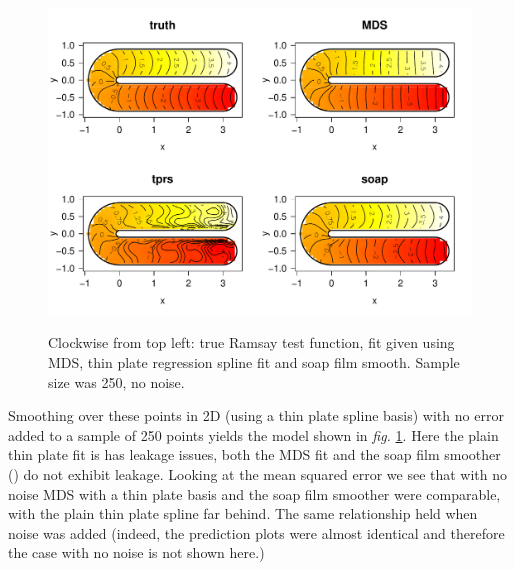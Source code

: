 \documentclass[a4paper,10pt]{article}
\newcommand{\fig}[1]{\emph{fig.} \ref{#1}}
\begin{document}
\begin{figure}
\centering
\includegraphics[width=5.5in]{figs/ramsay-mds-smooth-noerr.pdf} \\
\caption{Clockwise from top left: true Ramsay test function, fit given using MDS, thin plate regression spline fit and soap film smooth. Sample size was 250, no noise.}
\label{ramsay-mds-smooth-noerr}
\end{figure}

Smoothing over these points in 2D (using a thin plate spline basis) with no error added to a sample of 250 points yields the model shown in \fig{ramsay-mds-smooth-noerr}. Here the plain thin plate fit is has leakage issues, both the MDS fit and the soap film smoother (\cite{soap}) do not exhibit leakage. Looking at the mean squared error we see that with no noise MDS with a thin plate basis and the soap film smoother were comparable, with the plain thin plate spline far behind. The same relationship held when noise was added (indeed, the prediction plots were almost identical and therefore the case with no noise is not shown here.)


\end{document}
